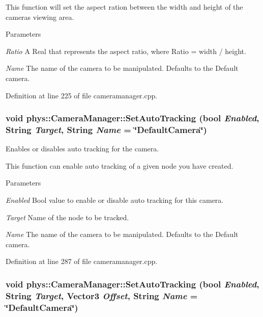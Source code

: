 This function will set the aspect ration between the width and height of the cameras viewing area. 
\begin{DoxyParams}{Parameters}
\item[{\em Ratio}]A Real that represents the aspect ratio, where Ratio = width / height. \item[{\em Name}]The name of the camera to be manipulated. Defaults to the Default camera. \end{DoxyParams}


Definition at line 225 of file cameramanager.cpp.

\hypertarget{classphys_1_1CameraManager_a6edd94b6e8d9f2fa1e0b84554b367933}{
\subsubsection[{SetAutoTracking}]{\setlength{\rightskip}{0pt plus 5cm}void phys::CameraManager::SetAutoTracking (bool {\em Enabled}, \/  {\bf String} {\em Target}, \/  {\bf String} {\em Name} = {\ttfamily \char`\"{}DefaultCamera\char`\"{}})}}
\label{d9/d91/classphys_1_1CameraManager_a6edd94b6e8d9f2fa1e0b84554b367933}


Enables or disables auto tracking for the camera. 

This function can enable auto tracking of a given node you have created. 
\begin{DoxyParams}{Parameters}
\item[{\em Enabled}]Bool value to enable or disable auto tracking for this camera. \item[{\em Target}]Name of the node to be tracked. \item[{\em Name}]The name of the camera to be manipulated. Defaults to the Default camera. \end{DoxyParams}


Definition at line 287 of file cameramanager.cpp.

\hypertarget{classphys_1_1CameraManager_a43d55c71817096add5dad1552239fc74}{
\subsubsection[{SetAutoTracking}]{\setlength{\rightskip}{0pt plus 5cm}void phys::CameraManager::SetAutoTracking (bool {\em Enabled}, \/  {\bf String} {\em Target}, \/  {\bf Vector3} {\em Offset}, \/  {\bf String} {\em Name} = {\ttfamily \char`\"{}DefaultCamera\char`\"{}})}}
\label{d9/d91/classphys_1_1CameraManager_a43d55c71817096add5dad1552239fc74}


